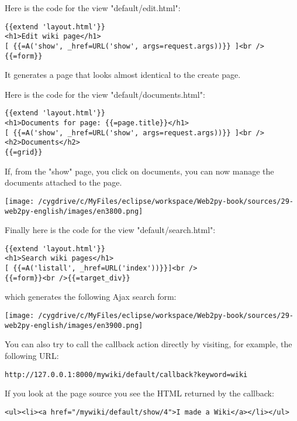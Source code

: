 \documentclass[justified,sixbynine,notoc]{tufte-book}
\begin{document}
\begin{fullwidth}
Here is the code for the view "default/edit.html":
\begin{lstlisting}[keywords={}]
{{extend 'layout.html'}}
<h1>Edit wiki page</h1>
[ {{=A('show', _href=URL('show', args=request.args))}} ]<br />
{{=form}}
\end{lstlisting}

It generates a page that looks almost identical to the create page.

Here is the code for the view "default/documents.html":
\begin{lstlisting}[keywords={}]
{{extend 'layout.html'}}
<h1>Documents for page: {{=page.title}}</h1>
[ {{=A('show', _href=URL('show', args=request.args))}} ]<br />
<h2>Documents</h2>
{{=grid}}
\end{lstlisting}

If, from the "show" page, you click on documents, you can now manage the documents attached to the page.


\goodbreak\begin{center}\texttt{[image: /cygdrive/c/MyFiles/eclipse/workspace/Web2py-book/sources/29-web2py-english/images/en3800.png]}\end{center}


Finally here is the code for the view "default/search.html":
\begin{lstlisting}[keywords={}]
{{extend 'layout.html'}}
<h1>Search wiki pages</h1>
[ {{=A('listall', _href=URL('index'))}}]<br />
{{=form}}<br />{{=target_div}}
\end{lstlisting}
\noindent which generates the following Ajax search form:


\goodbreak\begin{center}\texttt{[image: /cygdrive/c/MyFiles/eclipse/workspace/Web2py-book/sources/29-web2py-english/images/en3900.png]}\end{center}


You can also try to call the callback action directly by visiting, for example, the following URL:
\begin{lstlisting}[keywords={}]
http://127.0.0.1:8000/mywiki/default/callback?keyword=wiki
\end{lstlisting}

If you look at the page source you see the HTML returned by the callback:
\begin{lstlisting}[keywords={}]
<ul><li><a href="/mywiki/default/show/4">I made a Wiki</a></li></ul>
\end{lstlisting}


\end{fullwidth}
\end{document}
